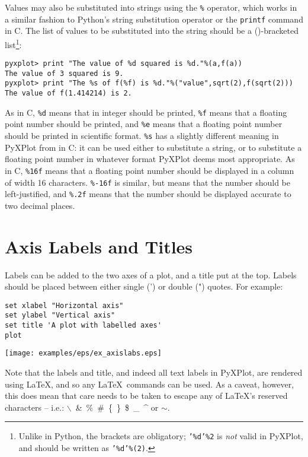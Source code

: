 \noindent Values may also be substituted into strings using the {\tt \%}
operator, which works in a similar fashion
to Python's string substitution operator or
the {\tt printf} command in C.  The list of values to be substituted into the
string should be a ()-bracketed list\footnote{Unlike in Python, the brackets
are obligatory; {\tt '\%d'\%2} is {\it not} valid in PyXPlot, and should be
written as {\tt '\%d'\%(2)}.}:

\begin{verbatim}
pyxplot> print "The value of %d squared is %d."%(a,f(a))
The value of 3 squared is 9.
pyxplot> print "The %s of f(%f) is %d."%("value",sqrt(2),f(sqrt(2)))
The value of f(1.414214) is 2.
\end{verbatim}

As in C, {\tt \%d} means that in integer should be printed, {\tt \%f} means
that a floating point number should be printed, and {\tt \%e} means that a
floating point number should be printed in scientific format. {\tt \%s} has a
slightly different meaning in PyXPlot from in C: it can be used either to
substitute a string, or to substitute a floating point number in whatever
format PyXPlot deems most appropriate. As in C, {\tt \%16f} means that a
floating point number should be displayed in a column of width 16 characters.
{\tt \%-16f} is similar, but means that the number should be left-justified,
and {\tt \%.2f} means that the number should be displayed accurate to two
decimal places.

\section{Axis Labels and Titles}
\label{sec:latex_incompatibility}

Labels can be added to the two axes of a plot, and a title put at the top.
Labels should be placed between either single (') or double (") quotes.  For
example:

\begin{verbatim}
set xlabel "Horizontal axis"
set ylabel "Vertical axis"
set title 'A plot with labelled axes'
plot
\end{verbatim}

\begin{center}
\texttt{[image: examples/eps/ex\_axislabs.eps]}
\end{center}

\noindent Note that the labels and title, and indeed all text
labels in PyXPlot, are rendered using \LaTeX, and so any \LaTeX\ commands can
be used.  As a caveat, however, this does mean that care needs to be taken to
escape any of \LaTeX's reserved characters -- i.e.:
$\backslash$~\&~\%~\#~\{~\}~\$~\_~\^{} or $\sim$.

